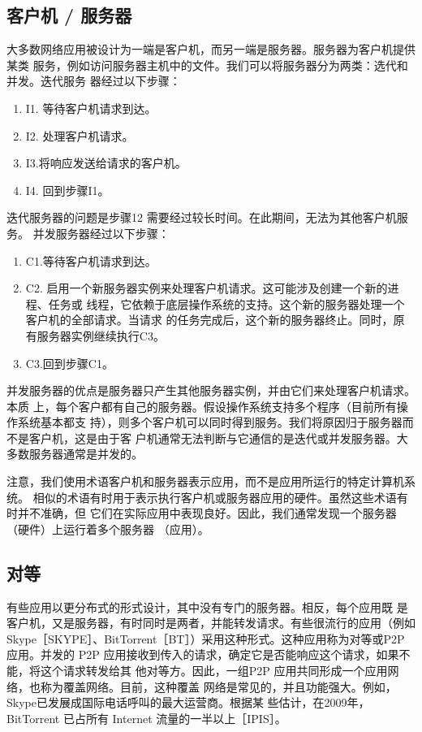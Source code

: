 \subsection{客户机 / 服务器}
大多数网络应用被设计为一端是客户机，而另一端是服务器。服务器为客户机提供某类
服务，例如访问服务器主机中的文件。我们可以将服务器分为两类：选代和并发。迭代服务
器经过以下步骤：
\begin{enumerate}
  \item I1. 等待客户机请求到达。
  \item I2. 处理客户机请求。
  \item I3.将响应发送给请求的客户机。
  \item I4. 回到步骤I1。
\end{enumerate}
迭代服务器的问题是步骤12 需要经过较长时间。在此期间，无法为其他客户机服务。
并发服务器经过以下步骤：

\begin{enumerate}
  \item C1.等待客户机请求到达。
  \item C2. 启用一个新服务器实例来处理客户机请求。这可能涉及创建一个新的进程、任务或
    线程，它依赖于底层操作系统的支持。这个新的服务器处理一个客户机的全部请求。当请求
    的任务完成后，这个新的服务器终止。同时，原有服务器实例继续执行C3。
  \item C3.回到步骤C1。
\end{enumerate}
并发服务器的优点是服务器只产生其他服务器实例，并由它们来处理客户机请求。本质
上，每个客户都有自己的服务器。假设操作系统支持多个程序（目前所有操作系统基本都支
持），则多个客户机可以同时得到服务。我们将原因归于服务器而不是客户机，这是由于客
户机通常无法判断与它通信的是迭代或并发服务器。大多数服务器通常是并发的。

注意，我们使用术语客户机和服务器表示应用，而不是应用所运行的特定计算机系统。
相似的术语有时用于表示执行客户机或服务器应用的硬件。虽然这些术语有时并不准确，但
它们在实际应用中表现良好。因此，我们通常发现一个服务器（硬件）上运行着多个服务器
（应用）。
\subsection{对等}
有些应用以更分布式的形式设计，其中没有专门的服务器。相反，每个应用既
是客户机，又是服务器，有时同时是两者，并能转发请求。有些很流行的应用（例如
Skype［SKYPE］、BitTorrent［BT］）采用这种形式。这种应用称为对等或P2P应用。并发的
P2P 应用接收到传入的请求，确定它是否能响应这个请求，如果不能，将这个请求转发给其
他对等方。因此，一组P2P 应用共同形成一个应用网络，也称为覆盖网络。目前，这种覆盖
网络是常见的，并且功能强大。例如，Skype已发展成国际电话呼叫的最大运营商。根据某
些估计，在2009年，BitTorrent 已占所有 Internet 流量的一半以上［IPIS］。

